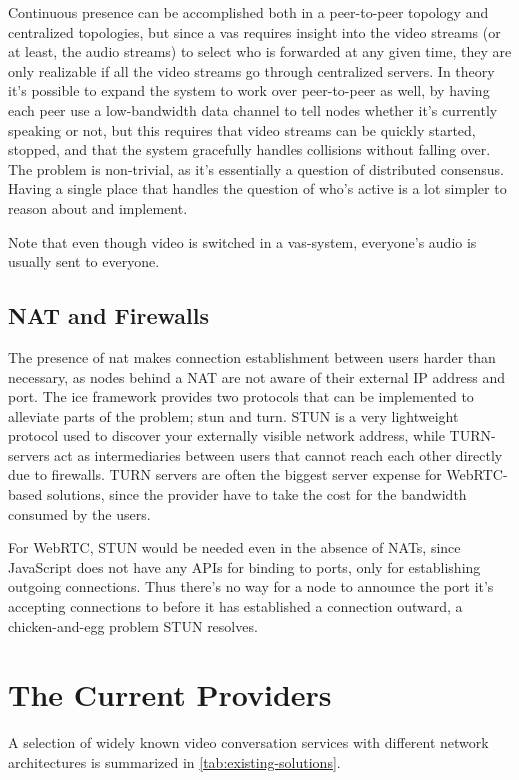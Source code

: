 Continuous presence can be accomplished both in a peer-to-peer topology and centralized topologies, but since a \gls{vas} requires insight into the video streams (or at least, the audio streams) to select who is forwarded at any given time, they are only realizable if all the video streams go through centralized servers. In theory it's possible to expand the system to work over peer-to-peer as well, by having each peer use a low-bandwidth data channel to tell nodes whether it's currently speaking or not, but this requires that video streams can be quickly started, stopped, and that the system gracefully handles collisions without falling over. The problem is non-trivial, as it's essentially a question of distributed consensus. Having a single place that handles the question of who's active is a lot simpler to reason about and implement.

Note that even though video is switched in a \gls{vas}-system, everyone's audio is usually sent to everyone.

\subsection{NAT and Firewalls}

The presence of \gls{nat} makes connection establishment between users harder than necessary, as nodes behind a NAT are not aware of their external IP address and port. The \gls{ice} framework provides two protocols that can be implemented to alleviate parts of the problem; \gls{stun} and \gls{turn}. STUN is a very lightweight protocol used to discover your externally visible network address, while TURN-servers act as intermediaries between users that cannot reach each other directly due to firewalls. TURN servers are often the biggest server expense for WebRTC-based solutions, since the provider have to take the cost for the bandwidth consumed by the users.

For WebRTC, STUN would be needed even in the absence of NATs, since JavaScript does not have any APIs for binding to ports, only for establishing outgoing connections. Thus there's no way for a node to announce the port it's accepting connections to before it has established a connection outward, a chicken-and-egg problem STUN resolves.


\section{The Current Providers}

A selection of widely known video conversation services with different network architectures is summarized in \autoref{tab:existing-solutions}.

